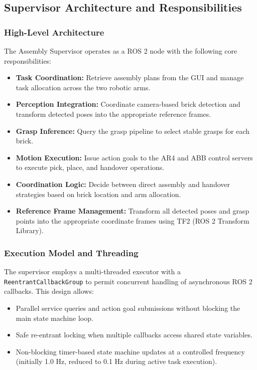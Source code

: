\subsection{Supervisor Architecture and Responsibilities}

\subsubsection{High-Level Architecture}

The Assembly Supervisor operates as a ROS 2 node with the following core responsibilities:

\begin{itemize}
    \item \textbf{Task Coordination:} Retrieve assembly plans from the GUI and manage task allocation across the two robotic arms.
    \item \textbf{Perception Integration:} Coordinate camera-based brick detection and transform detected poses into the appropriate reference frames.
    \item \textbf{Grasp Inference:} Query the grasp pipeline to select stable grasps for each brick.
    \item \textbf{Motion Execution:} Issue action goals to the AR4 and ABB control servers to execute pick, place, and handover operations.
    \item \textbf{Coordination Logic:} Decide between direct assembly and handover strategies based on brick location and arm allocation.
    \item \textbf{Reference Frame Management:} Transform all detected poses and grasp points into the appropriate coordinate frames using TF2 (ROS 2 Transform Library).
\end{itemize}

\subsubsection{Execution Model and Threading}

The supervisor employs a multi-threaded executor with a \texttt{ReentrantCallbackGroup} to permit concurrent handling of asynchronous ROS 2 callbacks. This design allows:

\begin{itemize}
    \item Parallel service queries and action goal submissions without blocking the main state machine loop.
    \item Safe re-entrant locking when multiple callbacks access shared state variables.
    \item Non-blocking timer-based state machine updates at a controlled frequency (initially 1.0 Hz, reduced to 0.1 Hz during active task execution).
\end{itemize}

